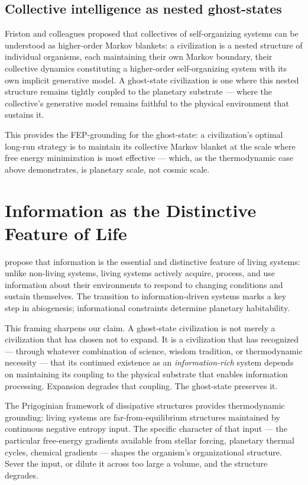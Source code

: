 \documentclass[12pt, a4paper]{article}
\begin{document}
\subsection{Collective intelligence as nested ghost-states}

Friston and colleagues \citep{friston2024} proposed that collectives of self-organizing
systems can be understood as higher-order Markov blankets: a civilization is a nested
structure of individual organisms, each maintaining their own Markov boundary, their
collective dynamics constituting a higher-order self-organizing system with its own implicit
generative model. A ghost-state civilization is one where this nested structure remains
tightly coupled to the planetary substrate --- where the collective's generative model
remains faithful to the physical environment that sustains it.

This provides the FEP-grounding for the ghost-state: a civilization's optimal long-run
strategy is to maintain its collective Markov blanket at the scale where free energy
minimization is most effective --- which, as the thermodynamic case above demonstrates, is
planetary scale, not cosmic scale.

\section{Information as the Distinctive Feature of Life}

\citet{bartlett2025} propose that information is the essential and distinctive feature of
living systems: unlike non-living systems, living systems actively acquire, process, and use
information about their environments to respond to changing conditions and sustain themselves.
The transition to information-driven systems marks a key step in abiogenesis; informational
constraints determine planetary habitability.

This framing sharpens our claim. A ghost-state civilization is not merely a civilization
that has chosen not to expand. It is a civilization that has recognized --- through whatever
combination of science, wisdom tradition, or thermodynamic necessity --- that its continued
existence as an \textit{information-rich} system depends on maintaining its coupling to the
physical substrate that enables information processing. Expansion degrades that coupling.
The ghost-state preserves it.

The Prigoginian framework of dissipative structures \citep{prigogine1984} provides
thermodynamic grounding: living systems are far-from-equilibrium structures maintained by
continuous negative entropy input. The specific character of that input --- the particular
free-energy gradients available from stellar forcing, planetary thermal cycles, chemical
gradients --- shapes the organism's organizational structure. Sever the input, or dilute it
across too large a volume, and the structure degrades.
\end{document}
